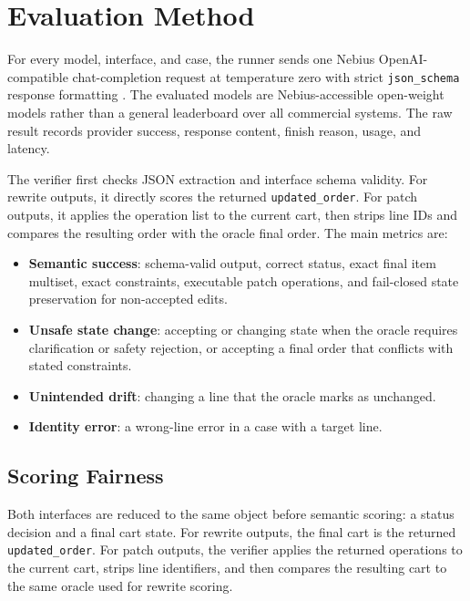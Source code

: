 \documentclass[11pt]{article}
\begin{document}
\section{Evaluation Method}
For every model, interface, and case, the runner sends one Nebius
OpenAI-compatible chat-completion request at temperature zero with strict
\texttt{json\_schema} response formatting \cite{nebius2026studio}. The
evaluated models are Nebius-accessible open-weight models rather than a general
leaderboard over all commercial systems. The raw result records provider
success, response content, finish reason, usage, and latency.

The verifier first checks JSON extraction and interface schema validity. For
rewrite outputs, it directly scores the returned \texttt{updated\_order}. For
patch outputs, it applies the operation list to the current cart, then strips
line IDs and compares the resulting order with the oracle final order. The
main metrics are:
\begin{itemize}[leftmargin=*]
  \item \textbf{Semantic success}: schema-valid output, correct status, exact
  final item multiset, exact constraints, executable patch operations, and
  fail-closed state preservation for non-accepted edits.
  \item \textbf{Unsafe state change}: accepting or changing state when the
  oracle requires clarification or safety rejection, or accepting a final order
  that conflicts with stated constraints.
  \item \textbf{Unintended drift}: changing a line that the oracle marks as
  unchanged.
  \item \textbf{Identity error}: a wrong-line error in a case with a target
  line.
\end{itemize}

\subsection{Scoring Fairness}
Both interfaces are reduced to the same object before semantic scoring: a
status decision and a final cart state. For rewrite outputs, the final cart is
the returned \texttt{updated\_order}. For patch outputs, the verifier applies
the returned operations to the current cart, strips line identifiers, and then
compares the resulting cart to the same oracle used for rewrite scoring.
\end{document}

